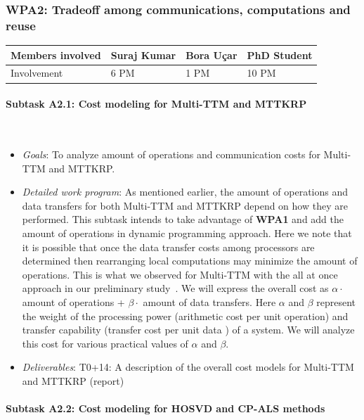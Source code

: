 \documentclass[a4paper,11pt]{article}
\newcommand{\subtask}[1]{{\color{orange}\paragraph{#1}$ $}}
\newcommand{\goal}{{\color{orange2}  \emph{Goals}:} }
\newcommand{\dwp}{{\color{orange2}  \emph{Detailed work program}: }}
\newcommand{\deliverables}{{\color{orange2}  \emph{Deliverables}: }}
\begin{document}
	\subsubsection{\textbf{WPA2}: Tradeoff among communications, computations and reuse}
	\begin{table}[H]
		\begin{tabular}{llll}
			\hline
			\cellcolor{blue2}
			Members involved & Suraj Kumar& Bora Uçar & PhD Student \\
			\hline
			\cellcolor{orange2}
			Involvement      & 6 PM            & 1 PM & 10 PM \\
			\hline
		\end{tabular}
	\end{table}
	\subtask{Subtask A2.1: Cost modeling for Multi-TTM and MTTKRP}
	\begin{itemize}[leftmargin=-1pt]
		\item[] \goal To analyze amount of operations and communication costs for Multi-TTM and MTTKRP. 
		\item[] \dwp As mentioned earlier, the amount of operations and data transfers for both Multi-TTM and MTTKRP depend on how they are performed. This subtask intends to take advantage of \textbf{WPA1} and add the amount of operations in dynamic programming approach. Here we note that it is possible that once the data transfer costs among processors are determined then rearranging local computations may minimize the amount of operations. This is what we observed for Multi-TTM with the all at once approach in our preliminary study~\cite{ABGKR-SIMAX-2024}. We will express the overall cost as $\alpha\cdot$ amount of operations + $\beta\cdot$ amount of data transfers. Here $\alpha$ and $\beta$ represent the weight of the processing power (arithmetic cost per unit operation) and transfer capability (transfer cost per unit data ) of a system. We will analyze this cost for various practical values of $\alpha$ and $\beta$.
		\item[] \deliverables T0+14: A description of the overall cost models for Multi-TTM and MTTKRP (report)
	\end{itemize}
	\subtask{Subtask A2.2: Cost modeling for HOSVD and CP-ALS methods}
\end{document}
